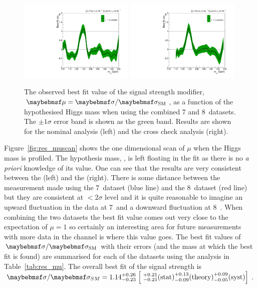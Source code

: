 \begin{figure}
  \includegraphics[width=0.49\textwidth]{results/plots/mva_greenband.pdf}
  \includegraphics[width=0.49\textwidth]{results/plots/sideband_greenband.pdf}
  \caption[The observed best fit value of the signal strength modifier $\mu$]{The observed best fit value of the signal strength modifier, $\mu=\musm$, as a function of the hypothesised Higgs mass \mH when using the combined 7 and 8~\TeV datasets. The $\pm1\sigma$ error band is shown as the green band. Results are shown for the nominal \MFM analysis (left) and the cross check \SMVA analysis (right).}
  \label{fig:res_mumh}
\end{figure}

Figure~\ref{fig:res_muscan} shows the one dimensional \NLL scan of $\mu$ when the Higgs mass \mH is profiled. The hypothesis mass, \mH, is left floating in the fit as there is no \textit{a priori} knowledge of its value. One can see that the results are very consistent between the \MFM (left) and the \SMVA (right). There is some distance between the measurement made using the 7~\TeV dataset (blue line) and the 8~\TeV dataset (red line) but they are consistent at $<2\sigma$ level and it is quite reasonable to imagine an upward fluctuation in the data at 7~\TeV and a downward fluctuation at 8~\TeV. When combining the two datasets the best fit value comes out very close to the \SM expectation of $\mu=1$ so certainly an interesting area for future measurements with more data in the \Hgg channel is where this value goes. The best fit values of $\musm$ with their errors (and the mass at which the best fit is found) are summarised for each of the datasets using the \MFM analysis in Table~\ref{tab:res_mu}. The overall best fit of the signal strength is $\sigma/\sigma_{SM} = 1.14^{+0.26}_{-0.23} \;\Bigl[\;^{+0.21}_{-0.21} \mathrm{(stat)} ^{+0.13}_{-0.09} \mathrm{(theory)} ^{+0.09}_{-0.05} \mathrm{(syst)} \Bigr]$.

